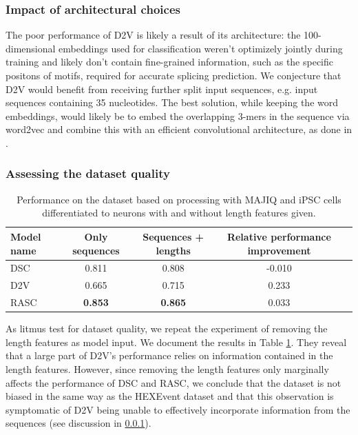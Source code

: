 \subsubsection{Impact of architectural choices} \label{subsubsec:majiq_architectural_choices}
The poor performance of D2V is likely a result of its architecture: the 100-dimensional embeddings used for classification weren't optimizely jointly during training and likely don't contain fine-grained information, such as the specific positons of motifs, required for accurate splicing prediction. We conjecture that D2V would benefit from receiving further split input sequences, e.g. input sequences containing 35 nucleotides. The best solution, while keeping the word embeddings, would likely be to embed the overlapping 3-mers in the sequence via word2vec and combine this with an efficient convolutional architecture, as done in \cite{d2vsplicing}.



\subsubsection{Assessing the dataset quality}

\begin{table}[h!]
	\centering
	\begin{tabular}{| l | c | c | c| c} 
		\hline
		Model name & Only sequences & Sequences + lengths & Relative performance improvement\\
		\hline
		DSC & 0.811 & 0.808 & -0.010\\
		D2V & 0.665 & 0.715 & 0.233\\
		RASC & \textbf{0.853} & \textbf{0.865} & 0.033\\
		\hline
	\end{tabular}
	\caption{Performance on the dataset based on processing with MAJIQ and iPSC cells differentiated to neurons with and without length features given. 
	}
	\label{table:majiq_nolens}
\end{table}

As litmus test for dataset quality, we repeat the experiment of removing the length features as model input. We document the results in Table \ref{table:majiq_nolens}.
They reveal that a large part of D2V's performance relies on information contained in the length features. However, since removing the length features only marginally affects the performance of DSC and RASC, we conclude that the dataset is not biased in the same way as the HEXEvent dataset and that this observation is symptomatic of D2V being unable to effectively incorporate information from the sequences (see discussion in \ref{subsubsec:majiq_architectural_choices}). 

